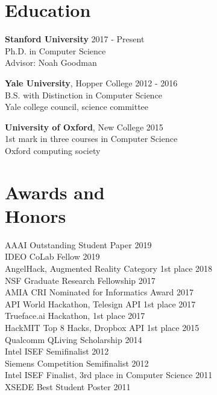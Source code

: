 \documentclass[margin, 10pt]{res} %
\begin{document}
\begin{resume}


\section{Education}

\textbf{Stanford University} \hfill 2017 - Present \\
Ph.D. in Computer Science \\
Advisor: Noah Goodman

\textbf{Yale University}, Hopper College \hfill 2012 - 2016 \\
B.S. with Distinction in Computer Science \\
Yale college council, science committee

\textbf{University of Oxford}, New College \hfill 2015 \\
1st mark in three courses in Computer Science\\
Oxford computing society


\section{Awards and \\ Honors}

AAAI Outstanding Student Paper \hfill 2019 \\
IDEO CoLab Fellow \hfill 2019 \\
AngelHack, Augmented Reality Category 1st place \hfill 2018 \\
NSF Graduate Research Fellowship \hfill 2017 \\
AMIA CRI Nominated for Informatics Award \hfill 2017 \\
API World Hackathon, Telesign API 1st place \hfill 2017 \\
Trueface.ai Hackathon, 1st place \hfill 2017 \\
HackMIT Top 8 Hacks, Dropbox API 1st place \hfill 2015 \\
Qualcomm QLiving Scholarship \hfill 2014 \\
Intel ISEF Semifinalist \hfill 2012 \\
Siemens Competition Semifinalist \hfill 2012 \\
Intel ISEF Finalist, 3rd place in Computer Science \hfill 2011 \\
XSEDE Best Student Poster \hfill 2011 \\


\end{resume}
\end{document}
